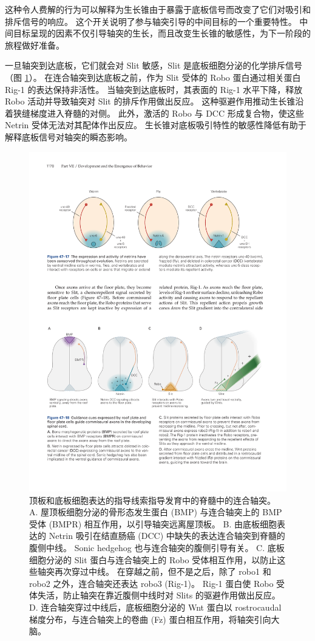 这种令人费解的行为可以解释为生长锥由于暴露于底板信号而改变了它们对吸引和排斥信号的响应。 这个开关说明了参与轴突引导的中间目标的一个重要特性。 中间目标呈现的因素不仅引导轴突的生长，而且改变生长锥的敏感性，为下一阶段的旅程做好准备。

一旦轴突到达底板，它们就会对 Slit 敏感，Slit 是底板细胞分泌的化学排斥信号（图 \ref{fig:47_18}）。 
在连合轴突到达底板之前，作为 Slit 受体的 Robo 蛋白通过相关蛋白 Rig-1 的表达保持非活性。 当轴突到达底板时，其表面的 Rig-1 水平下降，释放 Robo 活动并导致轴突对 Slit 的排斥作用做出反应。 这种驱避作用推动生长锥沿着狭缝梯度进入脊髓的对侧。 此外，激活的 Robo 与 DCC 形成复合物，使这些 Netrin 受体无法对其配体作出反应。 生长锥对底板吸引特性的敏感性降低有助于解释底板信号对轴突的瞬态影响。

\begin{figure}[htbp]
	\centering
	\includegraphics[width=0.95\linewidth]{chap47/fig_47_18}
	\caption{顶板和底板细胞表达的指导线索指导发育中的脊髓中的连合轴突。 A. 屋顶板细胞分泌的骨形态发生蛋白 (BMP) 与连合轴突上的 BMP 受体 (BMPR) 相互作用，以引导轴突远离屋顶板。 B. 由底板细胞表达的 Netrin 吸引在结直肠癌 (DCC) 中缺失的表达连合轴突到脊髓的腹侧中线。 Sonic hedgehog 也与连合轴突的腹侧引导有关。 C. 底板细胞分泌的 Slit 蛋白与连合轴突上的 Robo 受体相互作用，以防止这些轴突再次穿过中线。 在穿越之前，但不是之后，除了 robo1 和 robo2 之外，连合轴突还表达 robo3 (Rig-1)。 Rig-1 蛋白使 Robo 受体失活，防止轴突在靠近腹侧中线时对 Slits 的驱避作用做出反应。 D. 连合轴突穿过中线后，底板细胞分泌的 Wnt 蛋白以 rostrocaudal 梯度分布，与连合轴突上的卷曲 (Fz) 蛋白相互作用，将轴突引向大脑。}
	\label{fig:47_18}
\end{figure}

